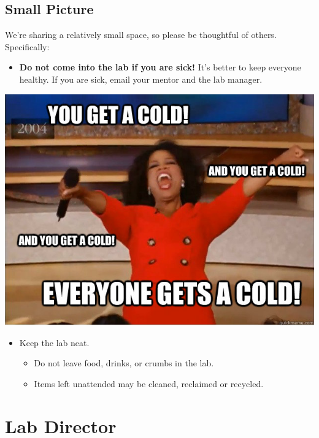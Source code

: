\documentclass[
]{book}
\providecommand{\tightlist}{%
  \setlength{\itemsep}{0pt}\setlength{\parskip}{0pt}}
\begin{document}
\hypertarget{small-picture}{%
\subsection{Small Picture}\label{small-picture}}

We're sharing a relatively small space, so please be thoughtful of others. Specifically:

\begin{itemize}
\tightlist
\item
  \textbf{Do not come into the lab if you are sick!} It's better to keep everyone healthy. If you are sick, email your mentor and the lab manager.
\end{itemize}

\includegraphics{images/sick.jpg}

\begin{itemize}
\tightlist
\item
  Keep the lab neat.

  \begin{itemize}
  \tightlist
  \item
    Do not leave food, drinks, or crumbs in the lab.\\
  \item
    Items left unattended may be cleaned, reclaimed or recycled.
  \end{itemize}
\end{itemize}

\hypertarget{lab-director}{%
\section{Lab Director}\label{lab-director}}
\end{document}
